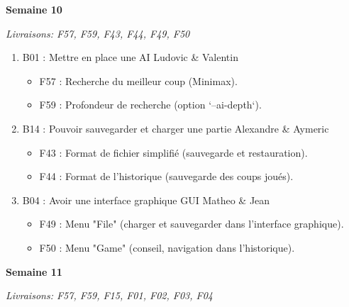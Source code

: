 \documentclass[a4paper,12pt]{article}
\begin{document}
\textbf{\large{Semaine 10}}

\textit{Livraisons: F57, F59, F43, F44, F49, F50}

\begin{enumerate}
  \item B01 : Mettre en place une AI\newline
  Ludovic \& Valentin
  \begin{itemize}
    \item F57 : Recherche du meilleur coup (Minimax).
    \item F59 : Profondeur de recherche (option `--ai-depth`).
  \end{itemize}
  \item B14 : Pouvoir sauvegarder et charger une partie\newline
  Alexandre \& Aymeric
  \begin{itemize}
    \item F43 : Format de fichier simplifié (sauvegarde et restauration).
    \item F44 : Format de l’historique (sauvegarde des coups joués).
  \end{itemize}
  \item B04 : Avoir une interface graphique GUI\newline
  Matheo \& Jean
  \begin{itemize}
    \item F49 : Menu "File" (charger et sauvegarder dans l’interface graphique).
    \item F50 : Menu "Game" (conseil, navigation dans l’historique).\newline
  \end{itemize}
\end{enumerate}

\textbf{\large{Semaine 11}}

\textit{Livraisons: F57, F59, F15, F01, F02, F03, F04}
\end{document}
